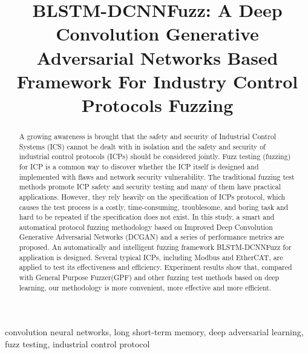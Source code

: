 \documentclass[conference]{IEEEtran}
\begin{document}
\title{BLSTM-DCNNFuzz: A Deep Convolution Generative Adversarial Networks Based Framework For Industry Control Protocols Fuzzing \\}
%
\maketitle

\begin{abstract}
A growing awareness is brought that the safety and security of Industrial Control Systems (ICS) cannot be dealt with in isolation and the safety and security of industrial control protocols (ICPs) should be considered jointly. Fuzz testing (fuzzing) for ICP is a common way to discover whether the ICP itself is designed and implemented with flaws and network security vulnerability. The traditional fuzzing test methods promote ICP safety and security testing and many of them have practical applications. However, they rely heavily on the specification of ICPs protocol, which causes the test process is a costly, time-consuming, troublesome, and boring task and hard to be repeated if the specification does not exist. In this study, a smart and automatical protocol fuzzing methodology based on Improved Deep Convolution Generative Adversarial Networks (DCGAN) and a series of performance metrics are proposed. An automatically and intelligent fuzzing framework BLSTM-DCNNFuzz for application is designed. Several typical ICPs, including Modbus and EtherCAT, are applied to test its effectiveness and efficiency. Experiment results show that, compared with General Purpose Fuzzer(GPF) and other fuzzing test methods based on deep learning, our methodology is more convenient, more effective and more efficient.
\end{abstract}

\begin{IEEEkeywords}
convolution neural networks, long short-term memory, deep adversarial learning, fuzz testing, industrial control protocol
\end{IEEEkeywords}








\nocite{*}


\end{document}
